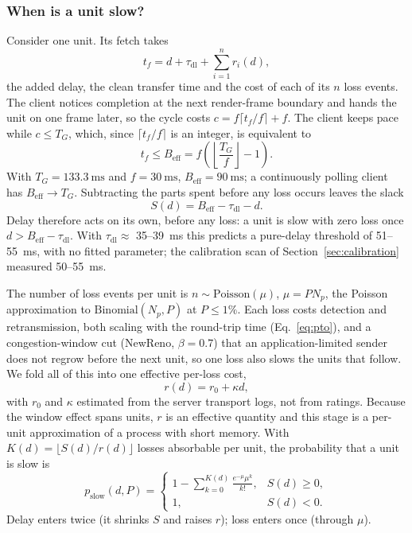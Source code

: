 \subsubsection{When is a unit slow?}
\label{sec:model-slow}
Consider one unit. Its fetch takes
\begin{equation}
  t_f = d + \tau_{\mathrm{dl}} + \sum_{i=1}^{n} r_i(d),
  \label{eq:fetch}
\end{equation}
the added delay, the clean transfer time and the cost of each of its
$n$ loss events. The client notices completion at the next render-frame
boundary and hands the unit on one frame later, so the cycle costs
$c = f\lceil t_f/f \rceil + f$. The client keeps pace while $c \le T_G$,
which, since $\lceil t_f/f \rceil$ is an integer, is equivalent to
\begin{equation}
  t_f \le B_{\mathrm{eff}} = f\left(\left\lfloor \frac{T_G}{f}\right\rfloor - 1\right).
  \label{eq:budget}
\end{equation}
With $T_G = \SI{133.3}{\milli\second}$ and $f = \SI{30}{\milli\second}$,
$B_{\mathrm{eff}} = \SI{90}{\milli\second}$; a continuously polling
client has $B_{\mathrm{eff}} \to T_G$. Subtracting the parts spent
before any loss occurs leaves the slack
\begin{equation}
  S(d) = B_{\mathrm{eff}} - \tau_{\mathrm{dl}} - d.
  \label{eq:slack}
\end{equation}
Delay therefore acts on its own, before any loss: a unit is slow with
zero loss once $d > B_{\mathrm{eff}} - \tau_{\mathrm{dl}}$. With
$\tau_{\mathrm{dl}} \approx$ 35--\SI{39}{\milli\second} this predicts a
pure-delay threshold of 51--\SI{55}{\milli\second}, with no fitted
parameter; the calibration scan of Section~\ref{sec:calibration}
measured 50--\SI{55}{\milli\second}.

The number of loss events per unit is $n \sim \mathrm{Poisson}(\mu)$,
$\mu = P N_p$, the Poisson approximation to $\mathrm{Binomial}(N_p, P)$
at $P \le 1\%$. Each loss costs detection
and retransmission, both scaling with the round-trip time
(Eq.~\eqref{eq:pto}), and a congestion-window cut (NewReno,
$\beta = 0.7$) that an application-limited sender does not regrow
before the next unit, so one loss also slows the units that follow. We
fold all of this into one effective per-loss cost,
\begin{equation}
  r(d) = r_0 + \kappa d,
  \label{eq:recovery}
\end{equation}
with $r_0$ and $\kappa$ estimated from the server transport logs, not
from ratings. Because the window effect spans units, $r$ is an
effective quantity and this stage is a per-unit approximation of a
process with short memory. With $K(d) = \lfloor S(d)/r(d) \rfloor$
losses absorbable per unit, the probability that a unit is slow is
\begin{equation}
  p_{\mathrm{slow}}(d,P) =
  \begin{cases}
    1 - \displaystyle\sum_{k=0}^{K(d)} \frac{e^{-\mu}\mu^k}{k!}, & S(d) \ge 0,\\[3mm]
    1, & S(d) < 0.
  \end{cases}
  \label{eq:pslow}
\end{equation}
Delay enters twice (it shrinks $S$ and raises $r$); loss enters once
(through $\mu$).

